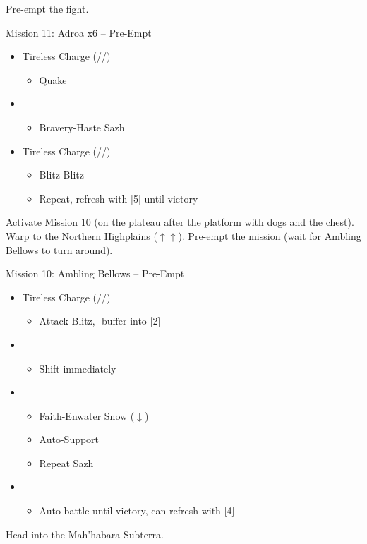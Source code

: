 \renewcommand{\third}{[3] Hero's Charge (\syn/\med/\com)}
\renewcommand{\fourth}{[4] Tireless Charge (\com/\med/\com)}

Pre-empt the fight.

\begin{battle}{Mission 11: Adroa x6 -- Pre-Empt}
	\begin{itemize}
		\item \fourth
			\begin{itemize}
				\item Quake
			\end{itemize}
		\item \first
			\begin{itemize}
				\item Bravery-Haste Sazh
			\end{itemize}
		\item \fourth
			\begin{itemize}
				\item Blitz-Blitz
				\item Repeat, refresh with [5] until victory
			\end{itemize}
	\end{itemize}
\end{battle}

Activate Mission 10 (on the plateau after the platform with dogs and the chest).
Warp to the Northern Highplains ($\uparrow\uparrow$).
Pre-empt the mission (wait for Ambling Bellows to turn around).

\begin{battle}{Mission 10: Ambling Bellows -- Pre-Empt}
	\begin{itemize}
		\item \fourth
			\begin{itemize}
				\item Attack-Blitz, \rav-buffer into [2]
			\end{itemize}
		\item \second
			\begin{itemize}
				\item Shift immediately
			\end{itemize}
		\item \first
			\begin{itemize}
				\item Faith-Enwater Snow ($\downarrow$)
				\item Auto-Support
				\item Repeat Sazh
			\end{itemize}
		\item \fifth
			\begin{itemize}
				\item Auto-battle until victory, can refresh with [4]
			\end{itemize}
	\end{itemize}
\end{battle}

Head into the Mah'habara Subterra.
\vfill